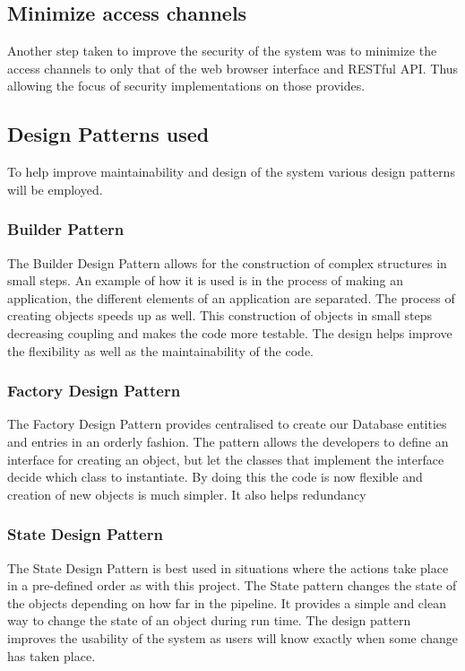 \documentclass[12pt]{article}
\begin{document}
\subsection{Minimize access channels}
Another step taken to improve the security of the system was to minimize the access channels to only that of the web browser interface and RESTful API. Thus allowing the focus of security implementations on those provides.


\subsection{Design Patterns used}
To help improve maintainability and design of the system various design patterns will be employed.

\subsubsection{Builder Pattern}
The Builder Design Pattern allows for the construction of complex structures in small steps. An example of how it is used is in the process of making an application, the different elements of an application are separated. The process of creating objects speeds up as well. This construction of objects in small steps decreasing coupling and makes the code more testable. The design helps improve the flexibility as well as the maintainability of the code.  

\subsubsection{Factory Design Pattern}
The Factory Design Pattern provides centralised to create our Database entities and entries in an orderly fashion. The pattern allows the developers to define an interface for creating an object, but let the classes that implement the interface decide which class to instantiate. By doing this the code is now flexible and creation of new objects is much simpler. It also helps redundancy 

\subsubsection{State Design Pattern}
The State Design Pattern is best used in situations where the actions take place in a pre-defined order as with this project. The State pattern changes the state of the objects depending on how far in the pipeline. It provides a simple and clean way to change the state of an object during run time. The design pattern improves the usability of the system as users will know exactly when some change has taken place. 
\end{document}
